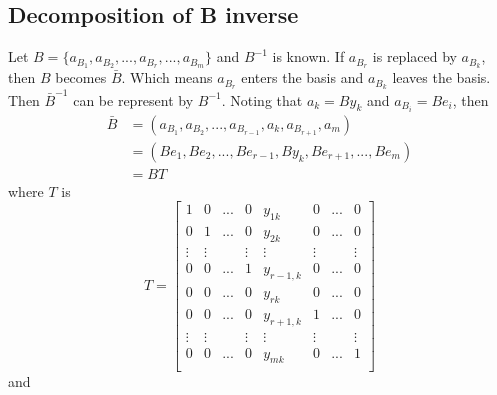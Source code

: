             \subsection{Decomposition of B inverse}
                Let $B=\{ a_{B_1}, a_{B_2}, ..., a_{B_r}, ..., a_{B_m}\}$ and $B^{-1}$ is known.
                If $a_{B_r}$ is replaced by $a_{B_k}$, then $B$ becomes $\bar{B}$. Which means $a_{B_r}$ enters the basis and $a_{B_k}$ leaves the basis. \\
                Then $\bar{B}^{-1}$ can be represent by $B^{-1}$. Noting that $a_k=By_k$ and $a_{B_i}=Be_i$, then
                \begin{align}
                    \bar{B} & = (a_{B_1}, a_{B_2}, ...,a_{B_{r-1}}, a_k, a_{B_{r+1}}, a_m) \nonumber \\
                    & = (Be_1, Be_2, ..., Be_{r-1}, By_k, Be_{r+1}, ..., Be_m) \nonumber \\
                    & = BT \nonumber
                \end{align}
                where $T$ is
                \begin{equation}
                    T=\left[ \begin{array}{cccccccc}
                        1 & 0 & ... & 0 & y_{1k} & 0 & ... & 0 \\
                        0 & 1 & ... & 0 &  y_{2k} & 0 & ... & 0 \\
                        \vdots & \vdots & & \vdots & \vdots & \vdots & & \vdots \\
                        0 & 0 & ... & 1 & y_{r-1,k} & 0 & ... & 0 \\
                        0 & 0 & ... & 0 & y_{rk} & 0 & ... & 0 \\
                        0 & 0 & ... & 0 &  y_{r+1,k} & 1 & ... & 0 \\
                        \vdots & \vdots & & \vdots & \vdots & \vdots & & \vdots \\
                        0 & 0 & ... & 0 &  y_{mk}& 0 & ... & 1 \\
                    \end{array} \right] \nonumber
                \end{equation}
                and 
